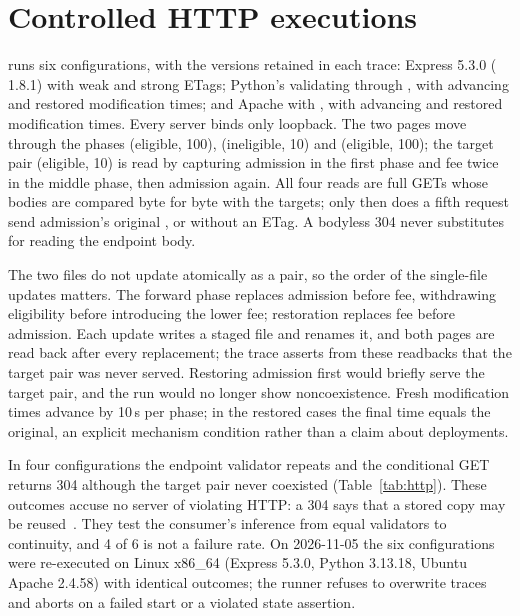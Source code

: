 \section{Controlled HTTP executions}\label{sec:http}
 runs six configurations, with the
versions retained in each trace: Express 5.3.0 ( 1.8.1) with weak
and strong ETags; Python's  validating through
, with advancing and restored modification times; and
Apache with , with advancing and restored
modification times. Every server binds only loopback. The two pages move
through the phases (eligible, 100), (ineligible, 10) and (eligible, 100); the
target pair (eligible, 10) is read by capturing admission in the first phase
and fee twice in the middle phase, then admission again. All four reads are
full GETs whose bodies are compared byte for byte with the targets; only then
does a fifth request send admission's original , or
 without an ETag. A bodyless 304 never substitutes for
reading the endpoint body.

The two files do not update atomically as a pair, so the order of the
single-file updates matters. The forward phase replaces admission before fee,
withdrawing eligibility before introducing the lower fee; restoration replaces
fee before admission. Each update writes a staged file and renames it, and both
pages are read back after every replacement; the trace asserts from these
readbacks that the target pair was never served. Restoring admission first
would briefly serve the target pair, and the run would no longer show
noncoexistence. Fresh modification times advance by 10\,s per phase; in the
restored cases the final time equals the original, an explicit mechanism
condition rather than a claim about deployments.

\begin{table}[t]
\caption{The six HTTP configurations (macOS) and the Linux re-execution.}
\label{tab:http}
\small
\setlength{\tabcolsep}{4pt}

\end{table}

In four configurations the endpoint validator repeats and the conditional GET
returns 304 although the target pair never coexisted (Table~\ref{tab:http}).
These outcomes accuse no server of violating HTTP: a 304 says that a stored
copy may be reused~\cite{http}. They test the consumer's inference from equal
validators to continuity, and 4 of 6 is not a failure rate. On 2026-11-05 the
six configurations were re-executed on Linux x86\_64 (Express 5.3.0, Python
3.13.18, Ubuntu Apache 2.4.58) with identical outcomes; the runner refuses to
overwrite traces and aborts on a failed start or a violated state assertion.

